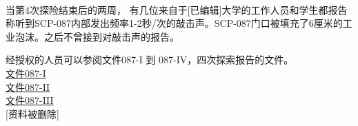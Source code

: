 \\
当第4次探险结束后的两周， 有几位来自于{[}已编辑]大学的工作人员和学生都报告称听到SCP-087内部发出频率1-2秒\slash 次的敲击声。SCP-087门口被填充了6厘米的工业泡沫。之后不曾接到对敲击声的报告。

经授权的人员可以参阅文件087-I 到 087-IV，四次探索报告的文件。\\
\hyperref[sec:DOC-document-087-i]{文件087-I}\\
\hyperref[sec:DOC-document-087-ii]{文件087-II}\\
\hyperref[sec:DOC-document-087-iii]{文件087-III}\\
{[}资料被删除]




